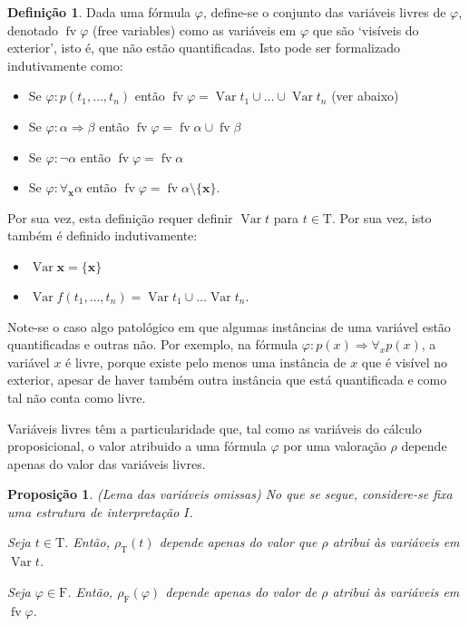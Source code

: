 \documentclass{report}
\newtheorem{prop}{Proposição}
\theoremstyle{definition}
\newtheorem{definicao}{Definição}
\theoremstyle{remark}
\renewcommand{\bf}[1]{\mathbf{#1}}
\newcommand{\F}{\mathrm{F}}
\newcommand{\T}{\mathrm{T}}
\DeclareMathOperator{\var}{Var}
\DeclareMathOperator{\fv}{fv}
\newcommand{\imply}{\mathbin{\Rightarrow}}
\begin{document}
	\begin{definicao}
	Dada uma fórmula $\varphi$, define-se o conjunto das variáveis livres de $\varphi$, denotado $\fv \varphi$ (free variables) como as variáveis em $\varphi$ que são `visíveis do exterior', isto é, que não estão quantificadas. Isto pode ser formalizado indutivamente como:
	
	\begin{itemize}
	\item Se $\varphi : p(t_1,\dots,t_n)$ então $\fv \varphi = \var t_1 \cup \dots \cup \var t_n$ (ver abaixo)
	
	\item Se $\varphi : \alpha \imply \beta$ então $\fv \varphi = \fv \alpha \cup \fv \beta$
	
	\item Se $\varphi : \neg \alpha$ então $\fv \varphi = \fv \alpha$
	
	\item Se $\varphi : \forall_{\bf x} \alpha$ então $\fv \varphi = \fv \alpha \setminus \{\bf x\}$.
	\end{itemize}
	
	Por sua vez, esta definição requer definir $\var t$ para $t \in \T$. Por sua vez, isto também é definido indutivamente:
	
	\begin{itemize}
	\item $\var \bf x = \{\bf x\}$
	
	\item $\var f(t_1, \dots, t_n) = \var t_1 \cup \dots \var t_n$.
	\end{itemize}
	\end{definicao}
	
	Note-se o caso algo patológico em que algumas instâncias de uma variável estão quantificadas e outras não. Por exemplo, na fórmula $\varphi : p(x) \imply \forall_x p(x)$, a variável $x$ é livre, porque existe pelo menos uma instância de $x$ que é visível no exterior, apesar de haver também outra instância que está quantificada e como tal não conta como livre.
	
	Variáveis livres têm a particularidade que, tal como as variáveis do cálculo proposicional, o valor atribuido a uma fórmula $\varphi$ por uma valoração $\rho$ depende apenas do valor das variáveis livres.
	
	\begin{prop}\label{mutevars} (Lema das variáveis omissas) No que se segue, considere-se fixa uma estrutura de interpretação $I$.
	
	Seja $t \in \T$. Então, $\rho_\T(t)$ depende apenas do valor que $\rho$ atribui às variáveis em $\var t$.
	
	Seja $\varphi \in \F$. Então, $\rho_\F(\varphi)$ depende apenas do valor de $\rho$ atribui às variáveis em $\fv \varphi$.
	\end{prop}
	
\end{document}
